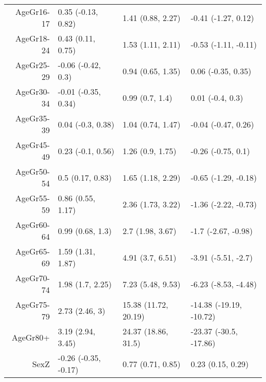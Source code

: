 \begin{table}[ht]
\begin{tabular}{rlll}
  AgeGr16-17 & 0.35 (-0.13, 0.82) & 1.41 (0.88, 2.27) & -0.41 (-1.27, 0.12) \\ 
  AgeGr18-24 & 0.43 (0.11, 0.75) & 1.53 (1.11, 2.11) & -0.53 (-1.11, -0.11) \\ 
  AgeGr25-29 & -0.06 (-0.42, 0.3) & 0.94 (0.65, 1.35) & 0.06 (-0.35, 0.35) \\ 
  AgeGr30-34 & -0.01 (-0.35, 0.34) & 0.99 (0.7, 1.4) & 0.01 (-0.4, 0.3) \\ 
  AgeGr35-39 & 0.04 (-0.3, 0.38) & 1.04 (0.74, 1.47) & -0.04 (-0.47, 0.26) \\ 
  AgeGr45-49 & 0.23 (-0.1, 0.56) & 1.26 (0.9, 1.75) & -0.26 (-0.75, 0.1) \\ 
  AgeGr50-54 & 0.5 (0.17, 0.83) & 1.65 (1.18, 2.29) & -0.65 (-1.29, -0.18) \\ 
  AgeGr55-59 & 0.86 (0.55, 1.17) & 2.36 (1.73, 3.22) & -1.36 (-2.22, -0.73) \\ 
  AgeGr60-64 & 0.99 (0.68, 1.3) & 2.7 (1.98, 3.67) & -1.7 (-2.67, -0.98) \\ 
  AgeGr65-69 & 1.59 (1.31, 1.87) & 4.91 (3.7, 6.51) & -3.91 (-5.51, -2.7) \\ 
  AgeGr70-74 & 1.98 (1.7, 2.25) & 7.23 (5.48, 9.53) & -6.23 (-8.53, -4.48) \\ 
  AgeGr75-79 & 2.73 (2.46, 3) & 15.38 (11.72, 20.19) & -14.38 (-19.19, -10.72) \\ 
  AgeGr80+ & 3.19 (2.94, 3.45) & 24.37 (18.86, 31.5) & -23.37 (-30.5, -17.86) \\ 
  SexZ & -0.26 (-0.35, -0.17) & 0.77 (0.71, 0.85) & 0.23 (0.15, 0.29) \\ 
   \hline
\end{tabular}
\end{table}
